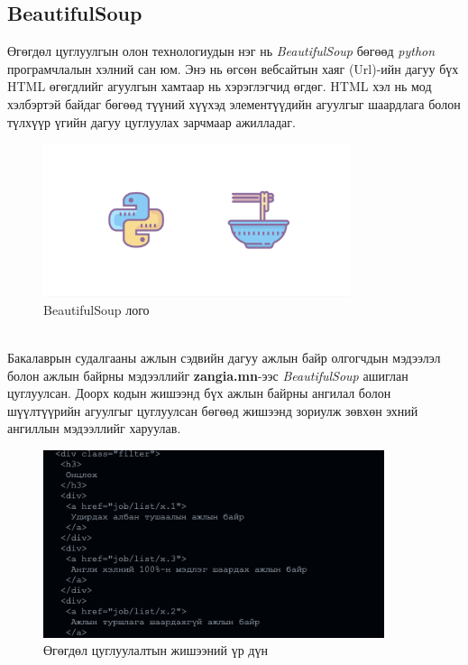 \subsection{BeautifulSoup}
Өгөгдөл цуглуулгын олон технологиудын нэг нь \textit{BeautifulSoup} бөгөөд \textit{python} програмчлалын хэлний сан юм. Энэ нь өгсөн вебсайтын хаяг (Url)-ийн дагуу бүх HTML өгөгдлийг агуулгын хамтаар нь хэрэглэгчид өгдөг. HTML хэл нь мод хэлбэртэй байдаг бөгөөд түүний хүүхэд элементүүдийн агуулгыг шаардлага болон түлхүүр үгийн дагуу цуглуулах зарчмаар ажилладаг. 
\begin{figure}[ht]
	\centering
  \includegraphics[height=4.5cm]{images/bs4.png}
	\caption{BeautifulSoup лого}\label{fig:bsLogo}
\end{figure}
\\Бакалаврын судалгааны ажлын сэдвийн дагуу ажлын байр олгогчдын мэдээлэл болон ажлын байрны мэдээллийг \textbf{zangia.mn}-ээс \textit{BeautifulSoup} ашиглан цуглуулсан. Доорх кодын жишээнд бүх ажлын байрны ангилал болон шүүлтүүрийн агуулгыг цуглуулсан бөгөөд жишээнд зориулж зөвхөн эхний ангиллын мэдээллийг харуулав.

\begin{figure}[ht]
  \centering
  \includegraphics[height=5.5cm]{images/bsExample.png}
	\caption{Өгөгдөл цуглуулалтын жишээний үр дүн}\label{fig:resultBS}
\end{figure}
